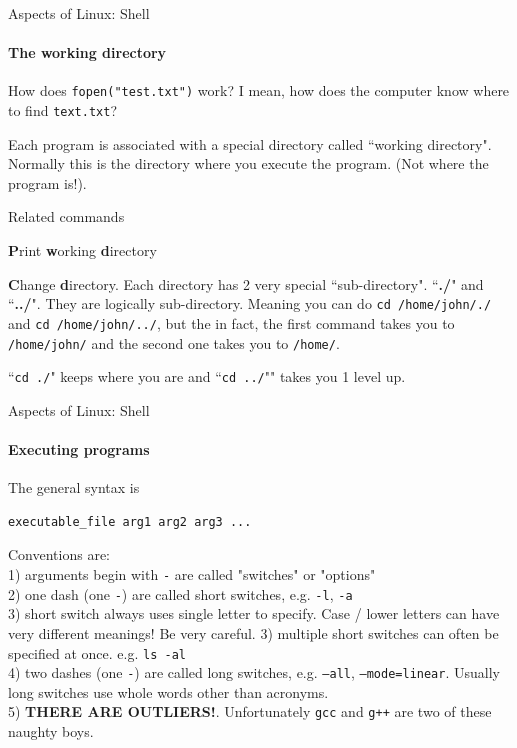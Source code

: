 \begin{frame}{Aspects of Linux: Shell}
\framesubtitle{The working directory}
	How does \texttt{fopen("test.txt")} work? I mean, how does the computer know where to find \texttt{text.txt}? 
	
	Each program is associated with a special directory called ``working directory". Normally this is the directory where you execute the program. (Not where the program is!). 

\begin{block}{Related commands}
	\small
	\begin{description}[pwd]
		\item[pwd] \textbf{P}rint \textbf{w}orking \textbf{d}irectory
		\item[cd] \textbf{C}hange \textbf{d}irectory. Each directory has 2 very special ``sub-directory". ``\textbf{./}" and ``\textbf{../}". They are logically sub-directory. Meaning you can do \texttt{cd /home/john/./} and \texttt{cd /home/john/../}, but the in fact, the first command takes you to \texttt{/home/john/} and the second one takes you to \texttt{/home/}. 
		
		``\texttt{cd ./}" keeps where you are and ``\texttt{cd ../}"" takes you 1 level up.
	\end{description}
	

\end{block}
\end{frame}

\begin{frame}[fragile]{Aspects of Linux: Shell}
\framesubtitle{Executing programs}
The general syntax is 
\begin{verbatim}
executable_file arg1 arg2 arg3 ...
\end{verbatim}
Conventions are:\\
1) arguments begin with \texttt{-} are called "switches" or "options" \\
2) one dash (one \texttt{-}) are called short switches, e.g. \texttt{-l}, \texttt{-a}\\
3) short switch always uses single letter to specify. Case / lower letters can have very different meanings! Be very careful.
3) multiple short switches can often be specified at once. e.g. \texttt{ls -al}\\
4) two dashes (one \texttt{-}) are called long switches, e.g. \texttt{--all}, \texttt{--mode=linear}. Usually long switches use whole words other than acronyms.\\
5) \textbf{THERE ARE OUTLIERS!}. Unfortunately \texttt{gcc} and \texttt{g++} are two of these naughty boys. 
\end{frame}

